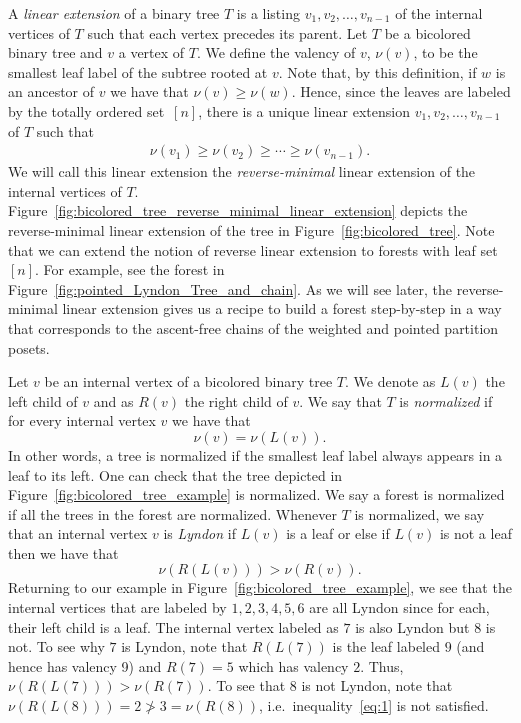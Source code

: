 \documentclass[11pt]{article}
\theoremstyle{definition}
\numberwithin{equation}{section}
\begin{document}
A \emph{linear extension} of a binary tree $T$ is a listing $v_1,v_2, \dots,v_{n-1}$ of the internal vertices of $T$ such that each vertex precedes its parent. 
Let $T$ be a bicolored binary tree and $v$ a vertex of $T$. We define the valency of $v$, $\nu(v)$,  to be the smallest leaf label of the subtree rooted at $v$.  Note that, by this definition, if $w$ is an ancestor of $v$ we have that $\nu(v)\ge \nu(w)$. Hence, since the leaves are labeled by the totally ordered set~$[n]$, there is a unique linear extension $v_1,v_2,\dots,v_{n-1}$  of $T$ such that
\begin{align}\label{equation:reverse_minimal_le}
    \nu(v_1)\ge \nu(v_2) \ge \cdots \ge \nu(v_{n-1}).
\end{align}
We will call this linear extension the \emph{reverse-minimal} linear extension of the internal vertices of $T$. Figure~\ref{fig:bicolored_tree_reverse_minimal_linear_extension} depicts the reverse-minimal linear extension of the tree in Figure~\ref{fig:bicolored_tree}.     Note that we can extend the notion of reverse linear extension to forests with leaf set $[n]$.   For example, see the forest in Figure~\ref{fig:pointed_Lyndon_Tree_and_chain}. As we will see later, the reverse-minimal linear extension gives us a recipe to build  a forest  step-by-step in a way that corresponds to the ascent-free chains of the weighted and pointed partition posets. 

Let $v$ be an internal vertex of a bicolored binary tree $T$. We denote as $L(v)$ the left child of $v$ and as $R(v)$ the right child of $v$. 
We say that $T$ is \emph{normalized} if for every internal vertex $v$ we have that
\begin{equation}\label{equation:normalized}\tag{N}
    \nu(v)=\nu(L(v)).
\end{equation}
In other words, a tree is normalized if  the smallest leaf label always appears in a leaf to its left.  One can check that the tree depicted in Figure~\ref{fig:bicolored_tree_example} is normalized. We say a forest is normalized if all the trees in the forest are normalized. Whenever $T$ is normalized, we say that an internal vertex $v$ is \emph{Lyndon} if $L(v)$ is a leaf or else if $L(v)$ is not a leaf then we have that
 \begin{equation}\label{eq:1}\tag{L}
     \nu(R(L(v)))>\nu(R(v)).
 \end{equation}
 Returning to our example in Figure~\ref{fig:bicolored_tree_example}, we see that the internal vertices that are labeled by $1,2,3,4,5,6$ are all Lyndon since for each,  their left child is a leaf. The internal vertex labeled as $7$ is also Lyndon but $8$ is not. To see why $7$ is Lyndon, note that $R(L(7))$ is the leaf labeled $9$ (and hence has valency 9) and $R(7)=5$ which has valency $2$. Thus, $ \nu(R(L(7)))>\nu(R(7))$. To see that $8$ is not Lyndon, note that  $\nu(R(L(8)))=2\not> 3= \nu(R(8))$, i.e.~inequality~\ref{eq:1} is not satisfied.
\end{document}
